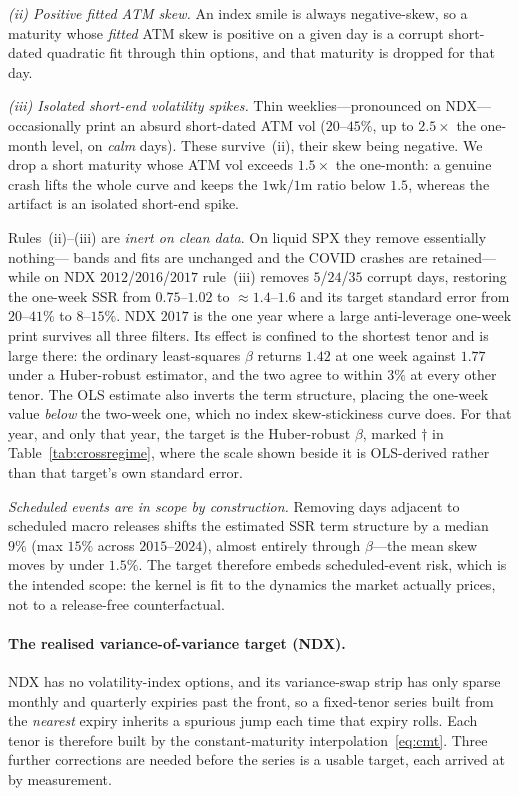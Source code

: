 \documentclass[11pt]{article}
\providecommand{\1}{\mathbf 1}
\begin{document}
\emph{(ii) Positive fitted ATM skew.} An index smile is always negative-skew, so a maturity whose
\emph{fitted} ATM skew is positive on a given day is a corrupt short-dated quadratic fit through thin
options, and that maturity is dropped for that day.

\emph{(iii) Isolated short-end volatility spikes.} Thin weeklies---pronounced on NDX---occasionally
print an absurd short-dated ATM vol ($20$--$45\%$, up to $2.5\times$ the one-month level, on
\emph{calm} days). These survive~(ii), their skew being negative. We drop a short maturity whose ATM
vol exceeds $1.5\times$ the one-month: a genuine crash lifts the whole curve and keeps the
$1$wk$/1$m ratio below $1.5$, whereas the artifact is an isolated short-end spike.

Rules~(ii)--(iii) are \emph{inert on clean data}. On liquid SPX they remove essentially nothing---
bands and fits are unchanged and the COVID crashes are retained---while on NDX $2012$/$2016$/$2017$
rule~(iii) removes $5$/$24$/$35$ corrupt days, restoring the one-week SSR from $0.75$--$1.02$ to
${\approx}1.4$--$1.6$ and its target standard error from $20$--$41\%$ to $8$--$15\%$. NDX $2017$ is the one year
where a large anti-leverage one-week print survives all three filters. Its effect is confined to the
shortest tenor and is large there: the ordinary least-squares $\beta$ returns $1.42$ at one week
against $1.77$ under a Huber-robust estimator, and the two agree to within $3\%$ at every other
tenor. The OLS estimate also inverts the term structure, placing the one-week value \emph{below} the
two-week one, which no index skew-stickiness curve does. For that year, and only that year, the
target is the Huber-robust $\beta$, marked $\dagger$ in Table~\ref{tab:crossregime}, where the
scale shown beside it is OLS-derived rather than that target's own standard error.

\emph{Scheduled events are in scope by construction.} Removing days adjacent to scheduled macro
releases shifts the estimated SSR term structure by a median $9\%$ (max $15\%$ across $2015$--$2024$),
almost entirely through $\beta$---the mean skew moves by under $1.5\%$. The target therefore embeds
scheduled-event risk, which is the intended scope: the kernel is fit to the dynamics the market
actually prices, not to a release-free counterfactual.

\paragraph{The realised variance-of-variance target (NDX).} NDX has no volatility-index options, and
its variance-swap strip has only sparse monthly and quarterly expiries past the front, so a fixed-tenor
series built from the \emph{nearest} expiry inherits a spurious jump each time that expiry rolls. Each
tenor is therefore built by the constant-maturity interpolation~\eqref{eq:cmt}. Three further
corrections are needed before the series is a usable target, each arrived at by measurement.
\end{document}
